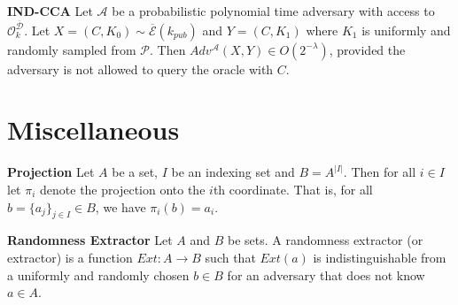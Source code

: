 \theoremstyle{definition}
\begin{definition}{\textbf{IND-CCA}}
Let $\mathcal{A}$ be a probabilistic polynomial time adversary with access to $\mathcal{O}_k^{\overline{\mathcal{D}}}$. Let $X = (C, K_0) \sim \overline{\mathcal{E}}(k_{pub})$ and $Y = (C, K_1)$ where $K_1$ is uniformly and randomly sampled from $\mathcal{P}$. Then $Adv^\mathcal{A}(X, Y) \in O(2^{-\lambda})$, provided the adversary is not allowed to query the oracle with $C$.
\end{definition}

\section{Miscellaneous}

\theoremstyle{definition}
\begin{definition}{\textbf{Projection}}
Let $A$ be a set, $I$ be an indexing set and $B = A^{|I|}$. Then for all $i \in I$ let $\pi_i$ denote the projection onto the $i$th coordinate. That is, for all $b = \{a_j\}_{j \in I} \in B$, we have $\pi_i(b) = a_i$.
\end{definition}

\theoremstyle{definition}
\begin{definition}{\textbf{Randomness Extractor}}
Let $A$ and $B$ be sets. A randomness extractor (or extractor) is a function $Ext: A \rightarrow B$ such that $Ext(a)$ is indistinguishable from a uniformly and randomly chosen $b \in B$ for an adversary that does not know $a \in A$.
\end{definition}